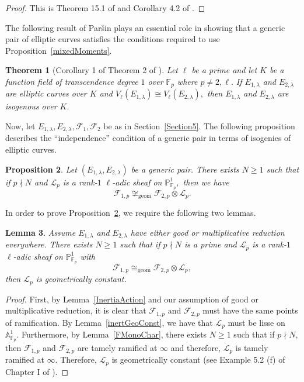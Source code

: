 \documentclass[12pt]{amsart}
\newtheorem{theorem}{Theorem}[section]
\newtheorem{lemma}[theorem]{Lemma}
\newtheorem{proposition}[theorem]{Proposition}
\theoremstyle{definition}
\theoremstyle{remark}
\numberwithin{equation}{section}
\def\A{\mathbb A}
\def\F{{\mathbb F}}
\def\F{\mathbb{F}}
\DeclareMathOperator{\geom}{geom}
\begin{document}
\begin{proof}
    This is Theorem 15.1 of \cite{MilneAVCollection} and Corollary 4.2 of \cite{ECMilneBook}.
\end{proof}

The following result of Paršin plays an essential role in showing that a generic pair of elliptic curves satisfies the conditions required to use Proposition~\ref{mixedMoments}.

\begin{theorem}[Corollary 1 of Theorem 2 of \cite{Parsin}]\label{Parsin}
    Let $\ell$ be a prime and let $K$ be a function field of transcendence degree $1$ over $\F_p$ where $p\neq 2,\ell.$ If $E_{1,\lambda}$ and $E_{2,\lambda}$ are elliptic curves over $K$ and $V_\ell(E_{1,\lambda})\cong V_\ell(E_{2,\lambda}),$ then $E_{1,\lambda}$ and $E_{2,\lambda}$ are isogenous over $K.$
\end{theorem}

Now, let $E_{1,\lambda},E_{2,\lambda},\mathcal{F}_1,\mathcal{F}_2$ be as in Section~\ref{Section5}. The following proposition describes the ``independence'' condition of a generic pair in terms of isogenies of elliptic curves.

\begin{proposition}\label{IsogenyCondition}
    Let $(E_{1,\lambda},E_{2,\lambda})$ be a generic pair. There exists $N\geq 1$ such that if $p\nmid N$ and $\mathcal{L}_p$ is a rank-$1$ $\ell$-adic sheaf on $\mathbb{P}_{\F_p}^1,$ then we have
    $$
    \mathcal{F}_{1,p}\not\cong_{\geom}\mathcal{F}_{2,p}\otimes\mathcal{L}_p.
    $$
\end{proposition}

In order to prove Proposition~\ref{IsogenyCondition}, we require the following two lemmas.

\begin{lemma}\label{geomConstant}
    Assume $E_{1,\lambda}$ and $E_{2,\lambda}$ have either good or multiplicative reduction everywhere. There exists $N\geq 1$ such that if $p\nmid N$ is a prime and $\mathcal{L}_p$ is a rank-$1$ $\ell$-adic sheaf on $\mathbb{P}_{\F_p}^1$ with
    $$
    \mathcal{F}_{1,p}\cong_{\geom}\mathcal{F}_{2,p}\otimes\mathcal{L}_p,
    $$
    then $\mathcal{L}_p$ is geometrically constant.
\end{lemma}

\begin{proof}
    First, by Lemma~\ref{InertiaAction} and our assumption of good or multiplicative reduction, it is clear that $\mathcal{F}_{1,p}$ and $\mathcal{F}_{2,p}$ must have the same points of ramification. By Lemma~\ref{inertGeoConst}, we have that $\mathcal{L}_p$ must be lisse on $\A_{\F_p}^1.$ Furthermore, by Lemma~\ref{FMonoChar}, there exists $N\geq 1$ such that if $p\nmid N$, then $\mathcal{F}_{1,p}$ and $\mathcal{F}_{2,p}$ are tamely ramified at $\infty$ and therefore, $\mathcal{L}_p$ is tamely ramified at $\infty.$ Therefore, $\mathcal{L}_p$ is geometrically constant (see Example 5.2 (f) of Chapter I of \cite{ECMilneBook}).
\end{proof}
\end{document}
